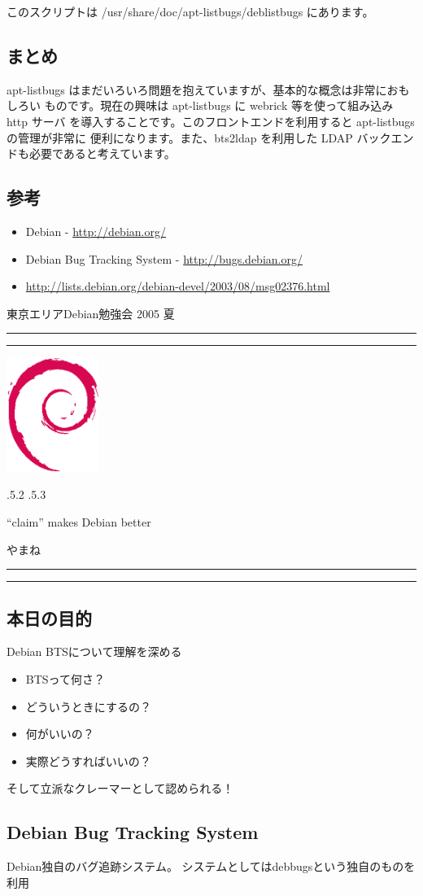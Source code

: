 \documentclass[mingoth,a4paper]{jsarticle}
\makeatletter
\renewcommand{\section}{\@startsection{section}{1}{\z@}%
    {\Cvs \@plus.5\Cdp \@minus.2\Cdp}%
    {.5\Cvs \@plus.3\Cdp}%
    {\normalfont\Large\headfont\raggedright\centering}} %
\newcommand{\dancersection}[2]{%
\newpage
東京エリアDebian勉強会 2005 夏
\hrule
\vspace{0.5mm}
\hrule
\hfill{}\includegraphics[width=3cm]{image200502/openlogo-nd.eps}\\
\vspace{-4cm}
\begin{center}
  \section{#1}
\end{center}
\hfill{}#2\hspace{3cm}\space\\
\hrule
\hrule
\vspace{1cm}
}
\makeatother
\begin{document}
このスクリプトは /usr/share/doc/apt-listbugs/deblistbugs にあります。

\subsection{まとめ}

apt-listbugs はまだいろいろ問題を抱えていますが、基本的な概念は非常におもしろい
ものです。現在の興味は apt-listbugs に webrick 等を使って組み込み http サーバ
を導入することです。このフロントエンドを利用すると apt-listbugs の管理が非常に
便利になります。また、bts2ldap を利用した LDAP バックエンドも必要であると考えています。

\subsection{参考}

\begin{itemize}
\item Debian - \url{http://debian.org/}
\item Debian Bug Tracking System - \url{http://bugs.debian.org/}
\item \url{http://lists.debian.org/debian-devel/2003/08/msg02376.html}
\end{itemize}


\dancersection{``claim'' makes Debian better}
{やまね}
\label{sec:yamane}

\subsection{本日の目的}

Debian BTSについて理解を深める

\begin{itemize}
\item BTSって何さ？
\item どういうときにするの？
\item 何がいいの？
\item 実際どうすればいいの？
\end{itemize}

そして立派なクレーマーとして認められる！

\subsection{Debian Bug Tracking System}

Debian独自のバグ追跡システム。
システムとしてはdebbugsという独自のものを利用
\end{document}
